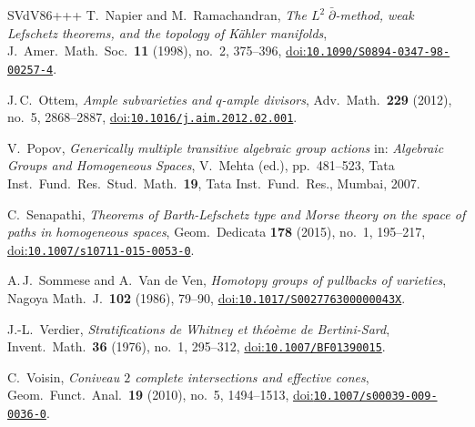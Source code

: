 \documentclass[10pt,a4paper]{article}
\numberwithin{equation}{section}
\theoremstyle{definition}
\theoremstyle{remark}
\providecommand\doi[1]{\href{https://doi.org/#1}{doi:\nolinkurl{#1}}}
\begin{document}
\begin{thebibliography}{SVdV86+++}
T.~Napier and M.~Ramachandran,  \emph{The $L^2\;\bar\partial$-method, weak Lefschetz theorems, and the topology of K\"ahler manifolds}, J.~Amer.\ Math.\ Soc.\ \textbf{11} (1998), no.~2, 375--396, \doi{10.1090/S0894-0347-98-00257-4}.

J.\,C.~Ottem, \emph{Ample subvarieties and $q$-ample divisors}, Adv.\ Math.\ \textbf{229} (2012), no.~5, 2868--2887, \doi{10.1016/j.aim.2012.02.001}.

V.~Popov, \emph{Generically multiple transitive algebraic group actions} in: \emph{Algebraic Groups and Homogeneous Spaces}, V.~Mehta (ed.), pp.~481--523, Tata Inst.\ Fund.\ Res.\ Stud.\ Math.\ \textbf{19},  Tata Inst.\ Fund.\ Res., Mumbai, 2007.

C.~Senapathi, \emph{Theorems of Barth-Lefschetz type and Morse theory on the space of paths in homogeneous spaces}, Geom.\ Dedicata \textbf{178} (2015), no.~1, 195--217, \doi{10.1007/s10711-015-0053-0}.

A.\,J.~Sommese and A.~Van de Ven, \emph{Homotopy groups of pullbacks of varieties}, Nagoya Math.~J.\ \textbf{102} (1986), 79--90, \doi{10.1017/S002776300000043X}.

J.-L.~Verdier, \emph{Stratifications de Whitney et th\'eo\`eme de Bertini-Sard}, Invent.\ Math.\ \textbf{36} (1976), no.~1, 295--312, \doi{10.1007/BF01390015}.

C.~Voisin, \emph{Coniveau $2$ complete intersections and effective cones}, Geom.\  Funct.\ Anal.\ \textbf{19} (2010), no.~5, 1494--1513, \doi{10.1007/s00039-009-0036-0}.

\end{thebibliography}
\end{document}
